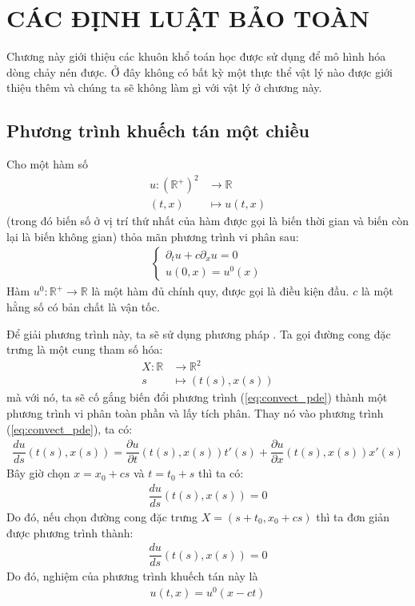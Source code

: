 \documentclass[DONG_CHAY_NEN_DUOC.tex]{subfiles}
\begin{document}
\chapter{CÁC ĐỊNH LUẬT BẢO TOÀN}

	Chương này giới thiệu các khuôn khổ toán học được sử dụng để mô hình hóa dòng chảy nén được. Ở đây không có bất kỳ một thực thể vật lý nào được giới thiệu thêm và chúng ta sẽ không làm gì với vật lý ở chương này.

\section{Phương trình khuếch tán một chiều}

Cho một hàm số
\[
	\begin{aligned}
		u\colon(\mathbb R^+)^2 &\longrightarrow\mathbb R\\
		(t,x)&\longmapsto u(t,x)		
	\end{aligned}
\]
(trong đó biến số ở vị trí thứ nhất của hàm được gọi là biến thời gian và biến còn lại là biến không gian) thỏa mãn phương trình vi phân sau:
\begin{align}\label{eq:convect_pde}
	\begin{cases}
		\partial_tu+c\partial_xu=0\\
		u(0,x)=u^0(x)
	\end{cases}
\end{align}
Hàm $u^0\colon\mathbb R^+\longrightarrow\mathbb R$ là một hàm đủ chính quy, được gọi là điều kiện đầu. $c$ là một hằng số có bản chất là vận tốc.

Để giải phương trình này, ta sẽ sử dụng phương pháp . Ta gọi đường cong đặc trưng là một cung tham số hóa:
\begin{equation}
\begin{aligned}
	X\colon\mathbb R&\longrightarrow\mathbb R^2\\
	s&\longmapsto \left(t(s),x(s)\right)
\end{aligned}
\end{equation}
mà với nó, ta sẽ cố gắng biến đổi phương trình (\ref{eq:convect_pde}) thành một phương trình vi phân toàn phần và lấy tích phân. Thay nó vào phương trình (\ref{eq:convect_pde}), ta có:
\[
	\begin{aligned}
		\dfrac{du}{ds}\left(t(s),x(s)\right)=\dfrac{\partial u}{\partial t}\left(t(s),x(s)\right)t'(s)+\dfrac{\partial u}{\partial x}\left(t(s),x(s)\right)x'(s)
	\end{aligned}
\]
Bây giờ chọn $x=x_0+cs$ và $t=t_0+s$ thì ta có:
\[
\begin{aligned}
	\dfrac{du}{ds}\left(t(s),x(s)\right)=0
\end{aligned}
\]
Do đó, nếu chọn đường cong đặc trưng $X = (s+t_0,x_0+cs)$ thì ta đơn giản được phương trình thành:
\begin{align}
	\dfrac{du}{ds}\left(t(s),x(s)\right)=0
\end{align}
Do đó, nghiệm của phương trình khuếch tán này là
\begin{align}
	u(t,x)=u^0(x-ct)
\end{align}
\end{document}
